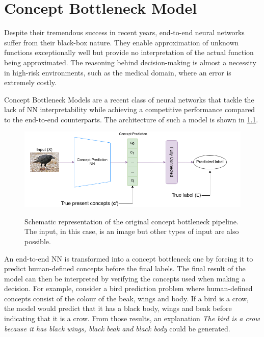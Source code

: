 \chapter{Concept Bottleneck Model}
\label{concept-bottleneck-pipeline}


Despite their tremendous success in recent years, end-to-end neural networks suffer from their black-box nature.
They enable approximation of unknown functions exceptionally well but provide no interpretation of the actual function being approximated.
The reasoning behind decision-making is almost a necessity in high-risk environments, such as the medical domain, where an error is extremely costly.

Concept Bottleneck Models \cite{RefWorks:RefID:35-koh2020concept} are a recent class of neural networks that tackle the lack of NN interpretability while achieving a competitive performance compared to the end-to-end counterparts. 
The architecture of such a model is shown in \ref{original-concept-bottleneck}.

\begin{figure}[h]
\caption{Schematic representation of the original concept bottleneck pipeline. The input, in this case, is an image but other types of input are also possible.}
\vspace{5pt}
\centering
\includegraphics[width=\textwidth]{concept-bottleneck-pipeline/original-concept-bottleneck-model.png}
\label{original-concept-bottleneck}
\end{figure}

An end-to-end NN is transformed into a concept bottleneck one by forcing it to predict human-defined concepts before the final labels.
The final result of the model can then be interpreted by verifying the concepts used when making a decision.
For example, consider a bird prediction problem where human-defined concepts consist of the colour of the beak, wings and body.
If a bird is a crow, the model would predict that it has a black body, wings and beak before indicating that it is a crow.
From those results, an explanation \emph{The bird is a crow because it has black wings, black beak and black body} could be generated.

